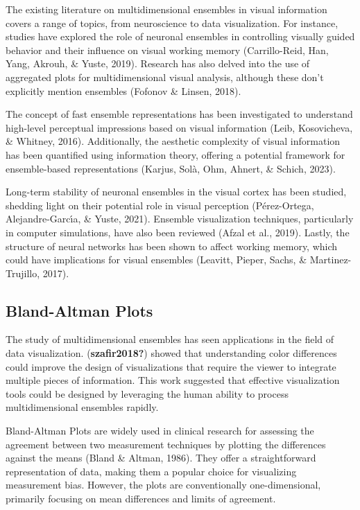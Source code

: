 \documentclass[print]{nuthesis}
\begin{document}
The existing literature on multidimensional ensembles in visual information covers a range of topics, from neuroscience to data visualization.
For instance, studies have explored the role of neuronal ensembles in controlling visually guided behavior and their influence on visual working memory (Carrillo-Reid, Han, Yang, Akrouh, \& Yuste, 2019).
Research has also delved into the use of aggregated plots for multidimensional visual analysis, although these don't explicitly mention ensembles (Fofonov \& Linsen, 2018).

The concept of fast ensemble representations has been investigated to understand high-level perceptual impressions based on visual information (Leib, Kosovicheva, \& Whitney, 2016).
Additionally, the aesthetic complexity of visual information has been quantified using information theory, offering a potential framework for ensemble-based representations (Karjus, Solà, Ohm, Ahnert, \& Schich, 2023).

Long-term stability of neuronal ensembles in the visual cortex has been studied, shedding light on their potential role in visual perception (Pérez-Ortega, Alejandre-Garcı́a, \& Yuste, 2021).
Ensemble visualization techniques, particularly in computer simulations, have also been reviewed (Afzal et al., 2019).
Lastly, the structure of neural networks has been shown to affect working memory, which could have implications for visual ensembles (Leavitt, Pieper, Sachs, \& Martinez-Trujillo, 2017).

\hypertarget{bland-altman-plots}{%
\subsection{Bland-Altman Plots}\label{bland-altman-plots}}

The study of multidimensional ensembles has seen applications in the field of data visualization.
(\textbf{szafir2018?}) showed that understanding color differences could improve the design of visualizations that require the viewer to integrate multiple pieces of information.
This work suggested that effective visualization tools could be designed by leveraging the human ability to process multidimensional ensembles rapidly.

Bland-Altman Plots are widely used in clinical research for assessing the agreement between two measurement techniques by plotting the differences against the means (Bland \& Altman, 1986).
They offer a straightforward representation of data, making them a popular choice for visualizing measurement bias.
However, the plots are conventionally one-dimensional, primarily focusing on mean differences and limits of agreement.
\end{document}
